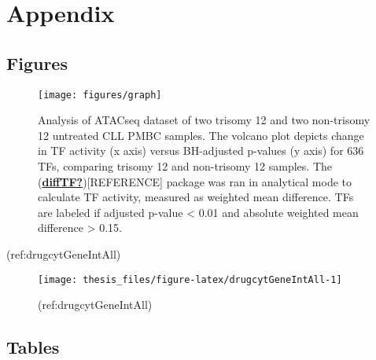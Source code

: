 \documentclass[11pt, a4paper, twosided]{book}
\begin{document}
\newpage

\hypertarget{appendix}{%
\chapter*{Appendix}\label{appendix}}

\hypertarget{figures}{%
\section*{Figures}\label{figures}}


\begin{figure}

{\centering \texttt{[image: figures/graph]} 

}

\caption{Analysis of ATACseq dataset of two trisomy 12 and two non-trisomy 12 untreated CLL PMBC samples. The volcano plot depicts change in TF activity (x axis) versus BH-adjusted p-values (y axis) for 636 TFs, comparing trisomy 12 and non-trisomy 12 samples. The (\protect\hyperlink{ref-diffTF}{\textbf{diffTF?}}){[}REFERENCE{]} package was ran in analytical mode to calculate TF activity, measured as weighted mean difference. TFs are labeled if adjusted p-value \textless{} 0.01 and absolute weighted mean difference \textgreater{} 0.15.}\label{fig:diffTFsmallvolPlot}
\end{figure}
(ref:drugcytGeneIntAll)
\begin{figure}

{\centering \texttt{[image: thesis\_files/figure-latex/drugcytGeneIntAll-1]} 

}

\caption{(ref:drugcytGeneIntAll)}\label{fig:drugcytGeneIntAll}
\end{figure}


\hypertarget{tables}{%
\section*{Tables}\label{tables}}
\end{document}

